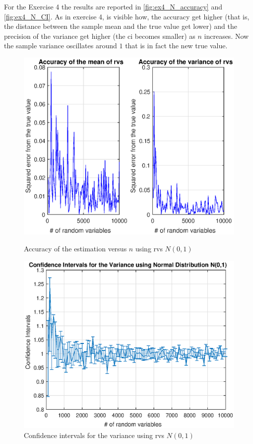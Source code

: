 \documentclass[11pt,a4paper]{article}
\begin{document}
For the Exercise 4 the results are reported in \autoref{fig:ex4_N_accuracy} and \autoref{fig:ex4_N_CI}. As in exercise 4, is visible how, the accuracy get higher (that is, the distance between the sample mean and the true value get lower)  and the precision of the variance get higher (the \gls{ci} becomes smaller) as $n$ increases. Now the sample variance oscillates around $1$ that is in fact the new true value.

\begin{figure}[ht]
	\centering
	\begin{minipage}{0.45\textwidth}
		\centering
		\includegraphics[width=\textwidth]{ex4_N_accuracy}
		\caption{Accuracy of the estimation versus $n$ using rvs $N(0,1)$}
		\label{fig:ex4_N_accuracy}
	\end{minipage}
	\begin{minipage}{0.45\textwidth}
		\centering
		\includegraphics[width=\textwidth]{ex4_N_CI}
		\caption{Confidence intervals for the variance using rvs $N(0,1)$}
		\label{fig:ex4_N_CI}
	\end{minipage}
\end{figure}
\end{document}
